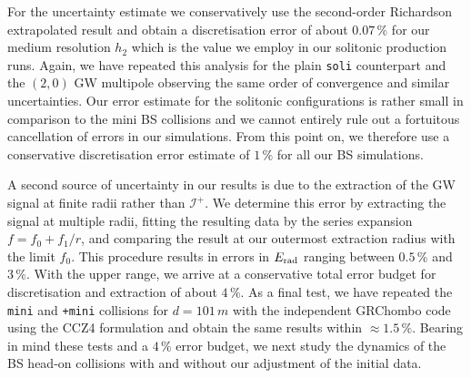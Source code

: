 %
For the uncertainty estimate we conservatively use
the second-order Richardson extrapolated result and
obtain a discretisation error of about $0.07\,\%$ for
our medium resolution $h_2$ which is the value
we employ in our solitonic production runs. Again,
we have repeated this analysis for the plain
{\tt soli} counterpart and the $(2,0)$ GW multipole
observing the same order of convergence and similar uncertainties. Our error estimate for the solitonic
configurations is rather small in comparison to the
mini BS collisions and we cannot entirely rule out a
fortuitous cancellation of errors in our simulations.
From this point on, we therefore use a conservative
discretisation error estimate of $1\,\%$ for all
our BS simulations.


A second source of uncertainty in our results is due
to the extraction of the GW signal at finite radii
rather than $\mathcal{I}^+$. We determine this error
by extracting the signal at multiple radii, fitting
the resulting data by the series expansion
$f=f_0+f_1/r$, and comparing the result at our outermost
extraction radius with the limit $f_0$. This procedure
results in errors in $E_{\rm rad}$ ranging between $0.5\,\%$
and $3\,\%$. With the upper range, we arrive at
a conservative total error budget for discretisation and
extraction of about $4\,\%$.
As a final test, we have repeated the {\tt mini} and
{\tt +mini} collisions for $d=101\,m$
with the independent {\sc GRChombo}
code \cite{Clough:2015sqa,Radia:2021} using the CCZ4 formulation \cite{Alic:2011gg} and obtain the same results within $\approx 1.5\,\%$.
Bearing in mind these tests and a $4\,\%$ error budget,
we next study the dynamics of the BS head-on collisions
with and without our adjustment of the initial data.


